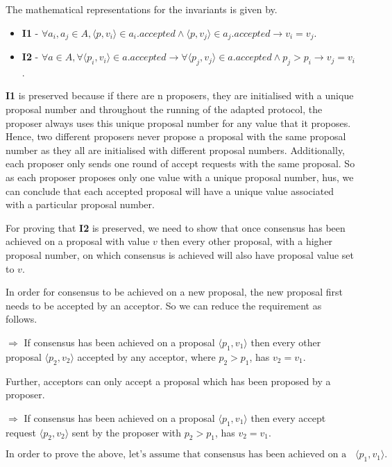 The mathematical representations for the invariants is given by.
\begin{itemize}
  \item \textbf{I1} - $\forall a_i, a_j \in A, \langle p, v_i \rangle \in a_{i}.accepted
  \land \langle p, v_j \rangle \in a_{j}.accepted \rightarrow v_i = v_j$.
  \item \textbf{I2} - $\forall a \in A, \forall \langle p_i, v_i \rangle \in a.accepted
    \rightarrow \forall \langle p_j, v_j \rangle \in  a.accepted \land p_j > p_i
    \rightarrow v_j = v_i$.
\end{itemize}

\textbf{I1} is preserved because if there are n proposers, they are
initialised with a unique proposal number and throughout the running of the
adapted protocol, the proposer always uses this unique proposal number for any
value that it proposes. Hence, two different proposers never propose a proposal
with the same proposal number as they all are initialised with different
proposal numbers. Additionally, each proposer only sends one round
of accept requests with the same proposal. So as each proposer proposes only one
value with a unique proposal number, hus, we can conclude that each accepted proposal
will have a unique value associated with a particular proposal number.

For proving that \textbf{I2} is preserved, we need to show that once consensus
has been achieved
on a proposal with value $v$ then every other proposal, with a higher
proposal number, on which consensus is achieved will also have
proposal value set to $v$.

In order for consensus to be achieved on a new proposal, the new
proposal first needs to be accepted by an acceptor.
So we can reduce the requirement as follows.

$\Rightarrow$ If consensus has been achieved on a proposal
$\langle p_1, v_1 \rangle$ then every other proposal $\langle p_2, v_2 \rangle$
accepted by any acceptor, where $p_2 > p_1$, has $v_2 = v_1$.

Further, acceptors can only accept a proposal which has been proposed
by a proposer.

$\Rightarrow$ If consensus has been achieved on a proposal $\langle p_1, v_1 \rangle$
then every accept request $\langle p_2, v_2 \rangle$ sent by the proposer with
$p_2 > p_1$, has $v_2 = v_1$.

\begin{equation}
\textrm{In order to prove the above, let's assume that consensus has been
achieved on a proposal} \langle p_1, v_1 \rangle.
\end{equation}

